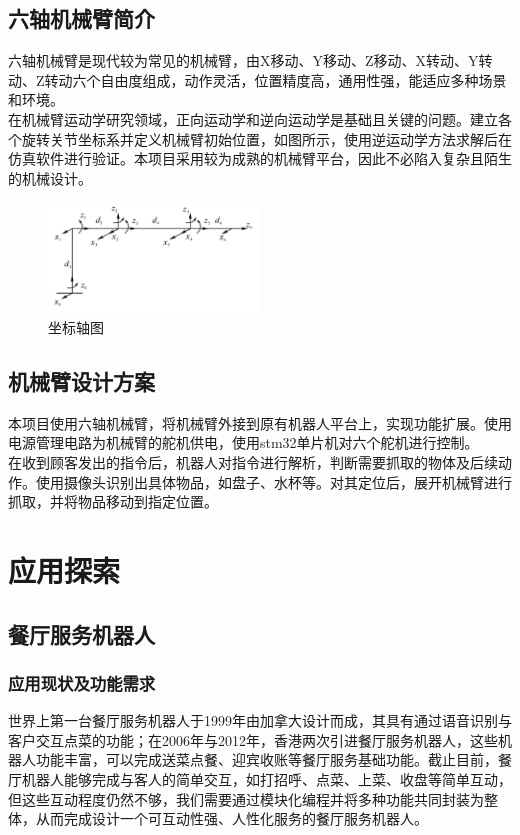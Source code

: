 \documentclass[11pt]{article}
\begin{document}
\subsection{六轴机械臂简介}
六轴机械臂是现代较为常见的机械臂，由X移动、Y移动、Z移动、X转动、Y转动、Z转动六个自由度组成，动作灵活，位置精度高，通用性强，能适应多种场景和环境。\\
在机械臂运动学研究领域，正向运动学和逆向运动学是基础且关键的问题。建立各个旋转关节坐标系并定义机械臂初始位置，如图所示，使用逆运动学方法求解后在仿真软件进行验证。本项目采用较为成熟的机械臂平台，因此不必陷入复杂且陌生的机械设计。
\begin{figure}[H] %
    \centering %
    \includegraphics[width=0.5\textwidth]{4} %
    \caption{坐标轴图}
\end{figure}
\subsection{机械臂设计方案}
本项目使用六轴机械臂，将机械臂外接到原有机器人平台上，实现功能扩展。使用电源管理电路为机械臂的舵机供电，使用stm32单片机对六个舵机进行控制。\\
在收到顾客发出的指令后，机器人对指令进行解析，判断需要抓取的物体及后续动作。使用摄像头识别出具体物品，如盘子、水杯等。对其定位后，展开机械臂进行抓取，并将物品移动到指定位置。
\section{应用探索}
\subsection{餐厅服务机器人}
\subsubsection{应用现状及功能需求}
世界上第一台餐厅服务机器人于1999年由加拿大设计而成，其具有通过语音识别与客户交互点菜的功能；在2006年与2012年，香港两次引进餐厅服务机器人，这些机器人功能丰富，可以完成送菜点餐、迎宾收账等餐厅服务基础功能。截止目前，餐厅机器人能够完成与客人的简单交互，如打招呼、点菜、上菜、收盘等简单互动，但这些互动程度仍然不够，我们需要通过模块化编程并将多种功能共同封装为整体，从而完成设计一个可互动性强、人性化服务的餐厅服务机器人。
\end{document}
